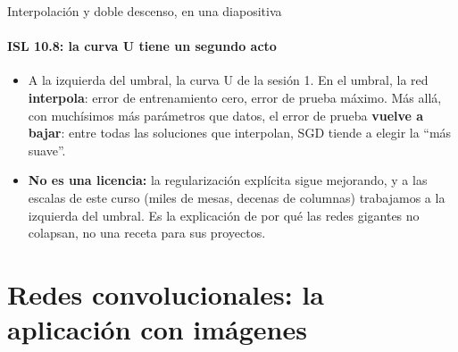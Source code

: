 \documentclass{beamer}
\newcommand{\1}{\mathbb{I}}
\begin{document}
\begin{frame}{Interpolación y doble descenso, en una diapositiva}
\framesubtitle{ISL 10.8: la curva U tiene un segundo acto}
\small
\begin{center}
\end{center}
\pause
\begin{itemize}\itemsep2pt
  \item A la izquierda del umbral, la curva U de la sesión 1. En el umbral, la red \textbf{interpola}: error de entrenamiento cero, error de prueba máximo. Más allá, con muchísimos más parámetros que datos, el error de prueba \textbf{vuelve a bajar}: entre todas las soluciones que interpolan, SGD tiende a elegir la ``más suave''.
  \item \textbf{No es una licencia:} la regularización explícita sigue mejorando, y a las escalas de este curso (miles de mesas, decenas de columnas) trabajamos a la izquierda del umbral. Es la explicación de por qué las redes gigantes no colapsan, no una receta para sus proyectos.
\end{itemize}
\end{frame}


\section{Redes convolucionales: la aplicación con imágenes}
\begin{frame}[noframenumbering]
\tableofcontents[currentsection]
\end{frame}
\end{document}
